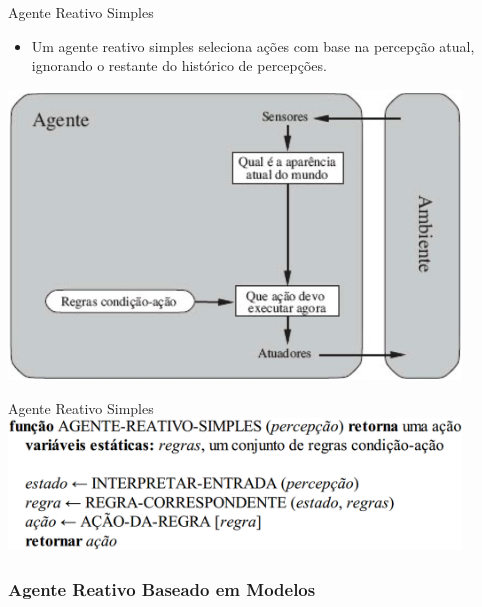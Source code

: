 \documentclass{libs/ufc_format}
\begin{document}
\begin{frame}{Agente Reativo Simples}
    \begin{itemize}
        \justifying
        \item Um agente reativo simples seleciona ações com base na percepção \alert{atual}, ignorando o restante do histórico de percepções.
    \end{itemize}
    \centering
    \includegraphics[width=0.9\textwidth]{figuras/figura04}
\end{frame}

\begin{frame}{Agente Reativo Simples}
    \centering
    \includegraphics[width=0.9\textwidth]{figuras/figura04_01}
\end{frame}

\subsubsection{Agente Reativo Baseado em Modelos}
\end{document}
